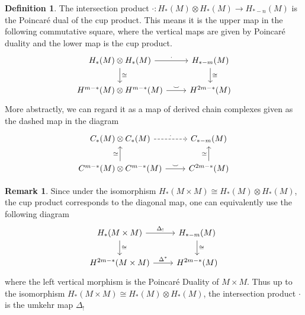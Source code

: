 \documentclass{scrartcl}
\theoremstyle{plain}
\theoremstyle{definition}
\newtheorem{definition}[theorem]{Definition}
\newtheorem{remark}[theorem]{Remark}
\newcommand{\cupp}{\mathbin{\smile}}
\newcommand{\iso}{\cong}
\newcommand{\quiso}{\simeq}
\begin{document}
\begin{definition}
The intersection product $\cdot\colon H_*(M)\otimes H_*(M)\to H_{*-n}(M)$ is the Poincaré dual of the cup product. This means it is the upper map in the following commutative square, where the vertical maps are given by Poincaré duality and the lower map is the cup product.
\begin{equation}
    \begin{tikzcd}
        H_*(M) \otimes H_*(M) \dar["\iso"] \rar["\cdot"] & H_{*-m}(M) \dar["\iso"] \\
        H^{m-*}(M)\otimes H^{m-*}(M) \rar["\cupp"] &  H^{2m-*}(M)
    \end{tikzcd}
\end{equation}
More abstractly, we can regard it as a map of derived chain complexes given as the dashed map in the diagram
\begin{equation}
    \begin{tikzcd}
        C_*(M) \otimes C_*(M)  \rar[dashed, "\cdot"] & C_{*-m}(M)  \\
        C^{m-*}(M)\otimes C^{m-*}(M) \uar["\quiso"]\rar["\cupp"] &  C^{2m-*}(M) \uar["\quiso"]
    \end{tikzcd}
\end{equation}
\end{definition}
\begin{remark}
Since under the isomorphism $H_*(M\times M) \iso H_*(M)\otimes H_*(M)$, the cup product corresponds to the diagonal map, one can equivalently use the following diagram
\begin{equation}
    \begin{tikzcd}
        H_*(M\times M) \dar["\iso"] \rar["\Delta_!"] & H_{*-m}(M) \dar["\iso"] \\
        H^{2m-*}(M\times M) \rar["\Delta^*"] & H^{2m-*}(M)
    \end{tikzcd}
\end{equation}
where the left vertical morphism is the Poincaré Duality of $M\times M$. Thus up to the isomorphism $H_*(M\times M) \iso H_*(M)\otimes H_*(M)$, the intersection product $\cdot$ is the umkehr map $\Delta_!$
\end{remark}
\end{document}
